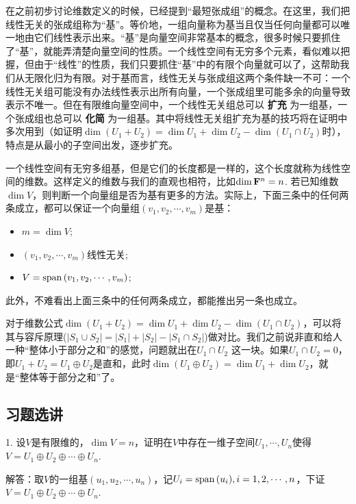 \documentclass[hyperref,]{ctexart}
\providecommand{\tightlist}{%
  \setlength{\itemsep}{0pt}\setlength{\parskip}{0pt}}
\begin{document}
在之前初步讨论维数定义的时候，已经提到``最短张成组''的概念。在这里，我们把线性无关的张成组称为``基''。等价地，一组向量称为基当且仅当任何向量都可以唯一地由它们线性表示出来。``基''是向量空间非常基本的概念，很多时候只要抓住了``基''，就能弄清楚向量空间的性质。一个线性空间有无穷多个元素，看似难以把握，但由于``线性''的性质，我们只要抓住``基''中的有限个向量就可以了，这帮助我们从无限化归为有限。对于基而言，线性无关与张成组这两个条件缺一不可：一个线性无关组可能没有办法线性表示出所有向量，一个张成组里可能多余的向量导致表示不唯一。但在有限维向量空间中，一个线性无关组总可以
\textbf{扩充} 为一组基，一个张成组也总可以 \textbf{化简}
为一组基。其中将线性无关组扩充为基的技巧将在证明中多次用到（如证明\(\dim(U_1+U_2)=\dim U_1+\dim U_2-\dim(U_1\cap U_2)\)时），特点是从最小的子空间出发，逐步扩充。

一个线性空间有无穷多组基，但是它们的长度都是一样的，这个长度就称为线性空间的维数。这样定义的维数与我们的直观也相符，比如\(\mathrm{dim}\, \mathbf{F}^n=n\).
若已知维数\(\dim V\)，则判断一个向量组是否为基有更多的方法。实际上，下面三条中的任何两条成立，都可以保证一个向量组\((v_1,v_2,\cdots,v_m)\)是基：

\begin{itemize}
\tightlist
\item
  \(m=\dim V\);
\item
  \((v_1,v_2,\cdots,v_m)\)线性无关;
\item
  \(V=\mathrm{span}\,(v_1,v_2,\cdots,v_m)\);
\end{itemize}

此外，不难看出上面三条中的任何两条成立，都能推出另一条也成立。

对于维数公式\(\dim(U_1+U_2)=\dim U_1+\dim U_2-\dim(U_1\cap U_2)\)，可以将其与容斥原理(\(|S_1\cup S_2|=|S_1|+|S_2|-|S_1\cap S_2|\))做对比。我们之前说非直和给人一种``整体小于部分之和''的感觉，问题就出在\(U_1\cap U_2\)
这一块。如果\(U_1\cap U_2={0}\)，即\(U_1+U_2=U_1\oplus U_2\)是直和，此时\(\dim (U_1\oplus U_2)=\dim U_1+\dim U_2\)，就是``整体等于部分之和''了。

\subsection{习题选讲}\label{ux4e60ux9898ux9009ux8bb2-2}

\noindent{} 1.
设\(V\)是有限维的，\(\dim V=n\)，证明在\(V\)中存在一维子空间\(U_1,\cdots,U_n\)使得\(V=U_1\oplus U_2\oplus\cdots\oplus U_n\).

\noindent{}
解答：取\(V\)的一组基\((u_1,u_2,\cdots,u_n)\)，记\(U_i = \mathrm{span}\,(u_i),i=1,2,\cdots,n\)，下证\(V=U_1\oplus U_2\oplus\cdots\oplus U_n\).
\end{document}

